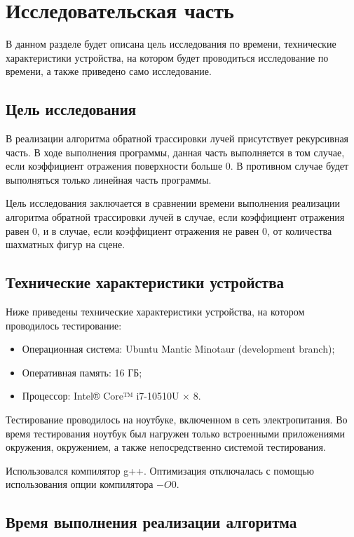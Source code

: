 \chapter{Исследовательская часть}

В данном разделе будет описана цель исследования по времени, технические характеристики устройства, на котором будет проводиться исследование по времени, а также приведено само исследование.

\section{Цель исследования}

В реализации алгоритма обратной трассировки лучей присутствует рекурсивная часть. В ходе выполнения программы, данная часть выполняется в том случае, если коэффициент отражения поверхности больше 0. В противном случае будет выполняться только линейная часть программы. 

Цель исследования заключается в сравнении времени выполнения реализации алгоритма обратной трассировки лучей в случае, если коэффициент отражения равен 0, и в случае, если коэффициент отражения не равен 0, от количества шахматных фигур на сцене.

\section{Технические характеристики устройства}

Ниже приведены технические характеристики устройства, на котором проводилось тестирование:

\begin{itemize}
	\item Операционная система: Ubuntu Mantic Minotaur (development branch);
	\item Оперативная память: 16 ГБ;
	\item Процессор: Intel® Core™ i7-10510U × 8.
\end{itemize}

Тестирование проводилось на ноутбуке, включенном в сеть электропитания. 
Во время тестирования ноутбук был нагружен только встроенными приложениями окружения, окружением, а также непосредственно системой тестирования. 

Использовался компилятор g++. 
Оптимизация отключалась с помощью использования опции компилятора $-O0$.

\section{Время выполнения реализации алгоритма}

